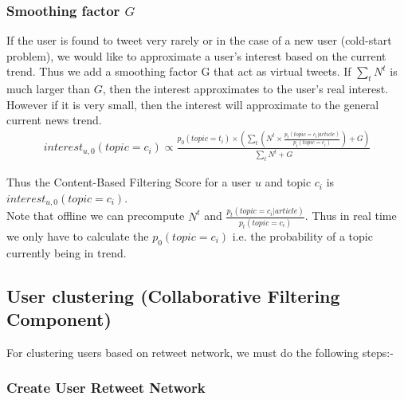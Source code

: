 \documentclass{article}
\begin{document}
\subsubsection{Smoothing factor $G$}

If the user is found to tweet very rarely or in the case of a new user (cold-start problem), we would like to approximate a user’s interest based on the current trend. Thus we add a smoothing factor G that act as virtual tweets. If $\sum_{t} N^t$ is much larger than $G$, then the interest approximates to the user’s real interest. However if it is very small, then the interest will approximate to the general current news trend. \\

\begin{equation}
\begin{aligned}
interest_{u,0}(topic = c_i) \propto \displaystyle\frac{p_0(topic = t_i) \times \left(\sum_{t} \left(N^t \times \displaystyle\frac{p_t(topic = c_i| article)}{p_t(topic = c_i)}\right) + G\right)}{\sum_{t} N^t + G }
\end{aligned}
\end{equation}

Thus the Content-Based Filtering Score for a user $u$ and topic $c_i$ is $interest_{u,0}(topic = c_i)$. \\
Note that offline we can precompute $N^t$ and $\displaystyle\frac{p_t(topic =c_i| article)}{p_t(topic = c_i)}$. Thus in real time we only have to calculate the $p_0(topic = c_i)$ i.e. the probability of a topic currently being in trend. \\

\subsection{User clustering (Collaborative Filtering Component)}

For clustering users based on retweet network, we must do the following steps:-

\subsubsection{Create User Retweet Network}
\end{document}
